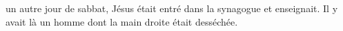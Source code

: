 \encetemps un autre jour de sabbat,
	Jésus était entré dans la synagogue et enseignait.
Il y avait là un homme dont la main droite était desséchée.

